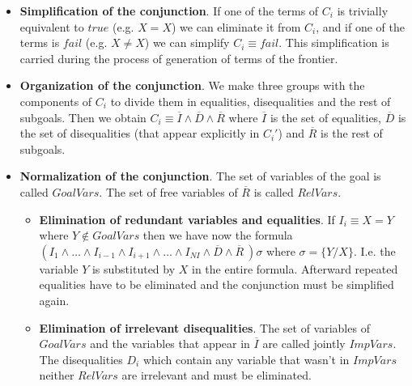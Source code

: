 \documentclass{llncs}
\begin{document}
\begin{itemize}

\item {\bf Simplification of the conjunction}. If one of the terms of
$C_i$ is trivially equivalent to 
$true$ (e.g. $X=X$) we can eliminate it from $C_i$, and if
one of the terms is $fail$ (e.g. $X \neq X$) we can simplify $C_i
\equiv fail$. This simplification is carried during the process
of generation of terms of the frontier.

\item {\bf Organization of the conjunction}. We make three groups with
the components of $C_i$ to divide them in equalities, disequalities
and the rest of subgoals. Then we obtain $C_i \equiv \overline{I}
\wedge \overline{D} \wedge \overline{R}$ where $\overline{I}$ is the
set of equalities, $\overline{D}$ is the set of disequalities (that
appear explicitly in $C_i'$) and $\overline{R}$ is the rest of subgoals.
  
\item {\bf Normalization of the conjunction}. The set of variables of the
goal is called $GoalVars$. The set of free variables of $\overline{R}$
is called $RelVars$.

    \begin{itemize}


       \item {\bf Elimination of redundant variables and
       equalities}. If $I_i \equiv X = Y$ where $Y \not\in GoalVars$
       then we have now the formula $ ( I_1 \wedge \ldots \wedge
       I_{i-1} \wedge I_{i+1} \wedge \ldots \wedge I_{NI} \wedge
       \overline{D} \wedge \overline{R}~) \sigma $ where $ \sigma = \{
       Y / X \}$. I.e. the variable $Y$ is substituted by $X$ in the
       entire formula. Afterward repeated equalities have to be
       eliminated and the conjunction must be simplified again.

       \item {\bf Elimination of irrelevant disequalities}. The set of
       variables of $GoalVars$ and the variables that appear in
       $\overline{I}$ are called jointly $ImpVars$. The disequalities
       $D_i$ which contain any variable that wasn't in $ImpVars$
       neither $RelVars$ are irrelevant and must be eliminated.

    \end{itemize}

 \end{itemize}

 
\end{document}

